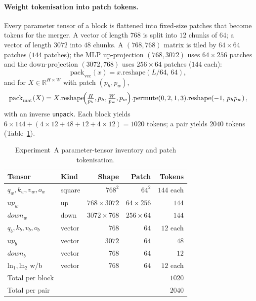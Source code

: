 \documentclass[10pt,a4paper]{article}
\begin{document}
\paragraph{Weight tokenisation into patch tokens.} Every parameter tensor of a
block is flattened into fixed-size patches that become tokens for the merger. A
vector of length $768$ is split into $12$ chunks of $64$; a vector of length
$3072$ into $48$ chunks. A $(768,768)$ matrix is tiled by $64\times64$ patches
($144$ patches); the MLP up-projection $(768,3072)$ uses $64\times256$ patches
and the down-projection $(3072,768)$ uses $256\times64$ patches ($144$ each):
\begin{equation}
\mathrm{pack}_\text{vec}(x) = x.\mathrm{reshape}(L/64,\,64),
\end{equation}
and for $X\in\mathbb{R}^{H\times W}$ with patch $(p_h,p_w)$,
\begin{equation}
\mathrm{pack}_\text{mat}(X)
= X.\mathrm{reshape}\!\Bigl(\tfrac{H}{p_h},p_h,\tfrac{W}{p_w},p_w\Bigr)
.\mathrm{permute}(0,2,1,3)
.\mathrm{reshape}\!\left(-1,\,p_h p_w\right),
\end{equation}
with an inverse \texttt{unpack}. Each block yields
$6\times144 + (4\times12+48+12+4\times12) = 1020$ tokens; a pair yields $2040$
tokens (Table~\ref{tab:families}).

\begin{table}[t]
\centering
\small
\begin{tabular}{llrrr}
\toprule
Tensor & Kind & Shape & Patch & Tokens \\
\midrule
$q_w,k_w,v_w,o_w$ & square & $768^2$ & $64^2$ & $144$ each \\
$up_w$  & up   & $768\times3072$ & $64\times256$ & $144$ \\
$down_w$& down & $3072\times768$ & $256\times64$ & $144$ \\
$q_b,k_b,v_b,o_b$ & vector & $768$ & $64$ & $12$ each \\
$up_b$  & vector & $3072$ & $64$ & $48$ \\
$down_b$& vector & $768$ & $64$ & $12$ \\
$\mathrm{ln}_1,\mathrm{ln}_2$ w/b & vector & $768$ & $64$ & $12$ each \\
\midrule
Total per block & & & & $1020$ \\
Total per pair  & & & & $2040$ \\
\bottomrule
\end{tabular}
\caption{Experiment~A parameter-tensor inventory and patch tokenisation.}
\label{tab:families}
\end{table}
\end{document}
